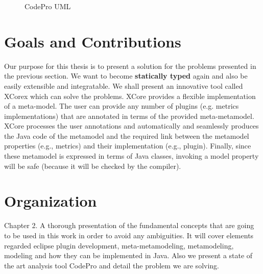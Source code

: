 \begin{figure}
\centering
{}
\caption{CodePro UML}
\label{fig:CycloAVGCodePro}
\end{figure}

\section{Goals and Contributions}
	
	Our purpose for this thesis is to present a solution for the problems presented
in the previous section. We want to become \textbf{statically typed} again and
also be easily extensible and integratable. We shall present an innovative tool
called XCorex which can solve the problems. XCore provides a flexible implementation of a meta-model. 
The user can provide any number of plugins (e.g. metrics implementations) 
that are annotated in terms of the provided meta-metamodel. XCore processes the
user annotations and automatically and seamlessly produces  the Java code of the metamodel and
the required link between the metamodel properties (e.g., metrics) and their implementation (e.g., plugin).
Finally, since these metamodel is expressed in terms of Java classes, 
invoking a model property will be safe (because it will be checked by the compiler). 


\section {Organization}
		Chapter 2.  A thorough presentation of the fundamental concepts that are going
to be used in this work in order to avoid any ambiguities.	It will cover
elements regarded eclipse plugin development, meta-metamodeling, metamodeling,
modeling and how they can be implemented in Java. Also we present a state of the
art analysis tool CodePro and detail the problem we are solving.

